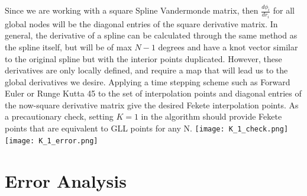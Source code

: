 \documentclass{article}
\begin{document}
Since we are working with a square Spline Vandermonde matrix, then $\frac{d\phi_i}{dr_i}$ for all global nodes will be the diagonal entries of the square derivative matrix. In general, the derivative of a spline can be calculated through the same method as the spline itself, but will be of max $N-1$ degrees and have a knot vector similar to the original spline but with the interior points duplicated. However, these derivatives are only locally defined, and require a map that will lead us to the global derivatives we desire. Applying a time stepping scheme such as Forward Euler or Runge Kutta 45 to the set of interpolation points and diagonal entries of the now-square derivative matrix give the desired Fekete interpolation points. As a precautionary check, setting $K=1$ in the algorithm should provide Fekete points that are equivalent to GLL points for any N.
\newline\newline\newline
\texttt{[image: K\_1\_check.png]} \texttt{[image: K\_1\_error.png]}

\section*{Error Analysis}
\end{document}
